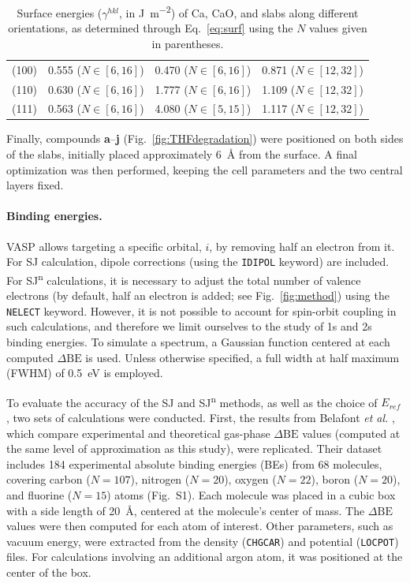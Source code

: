 \documentclass[journal=jpccck,manuscript=article]{achemso}
\def\dbe{\ensuremath{\Delta\text{BE}}}
\begin{document}
\begin{table}[!h]
	\centering
	\begin{tabular}{lccc}
		\toprule
		&	\ce{Ca} & \ce{CaO} &	\ce{CaH2} \\
		\midrule
		(100) & 0.555 ($N\in[6,16]$) & 0.470 ($N\in[6,16]$) & 0.871  ($N\in[12,32]$)\\
		(110) & 0.630  ($N\in[6,16]$)& 1.777  ($N\in[6,16]$)& 1.109 ($N\in[12,32]$)\\
		(111) & 0.563  ($N\in[6,16]$) & 4.080  ($N\in[5,15]$)  & 1.117   ($N\in[12,32]$) \\ 
		\bottomrule
	\end{tabular}
	\caption{Surface energies ($\gamma^{hkl}$, in \si{\joule\per\meter\squared}) of Ca, CaO, and  slabs along different orientations, as determined through Eq.~\eqref{eq:surf} using the $N$ values given in parentheses.}
	\label{tab:surf}
\end{table}

Finally, compounds \textbf{a}--\textbf{j} (Fig.~\ref{fig:THFdegradation}) were positioned on both sides of the slabs, initially placed approximately \SI{6}{\angstrom} from the surface. A final optimization was then performed, keeping the cell parameters and the two central layers fixed.

\paragraph{Binding energies.}  VASP allows targeting a specific orbital, $i$, by removing half an electron from it. For SJ calculation, dipole corrections (using the \texttt{IDIPOL} keyword) are included. For SJ\textsuperscript{n} calculations, it is necessary to adjust the total number of valence electrons (by default, half an electron is added; see Fig.~\ref{fig:method}) using the \texttt{NELECT} keyword. However, it is not possible to account for spin-orbit coupling in such calculations, and therefore we limit ourselves to the study of 1s and 2s binding energies. To simulate a spectrum, a Gaussian function centered at each computed \dbe{} is used. Unless otherwise specified, a full width at half maximum (FWHM) of \SI{0.5}{\electronvolt} is employed.

To evaluate the accuracy of the SJ and SJ\textsuperscript{n} methods, as well as the choice of $E_{ref}$, two sets of calculations were conducted. First, the results from Belafont \textit{et al.} \cite{pueyobellafontPredictingCoreLevel2017}, which compare experimental and theoretical gas-phase \dbe{} values (computed at the same level of approximation as this study), were replicated. Their dataset includes 184 experimental absolute binding energies (BEs) from 68 molecules, covering carbon ($N=107$), nitrogen ($N=20$), oxygen ($N=22$), boron ($N=20$), and fluorine ($N=15$) atoms (Fig.~S1). Each molecule was placed in a cubic box with a side length of \SI{20}{\angstrom}, centered at the molecule's center of mass. The \dbe{} values were then computed for each atom of interest. Other parameters, such as vacuum energy, were extracted from the density (\texttt{CHGCAR}) and potential (\texttt{LOCPOT}) files. For calculations involving an additional argon atom, it was positioned at the center of the box.
\end{document}
